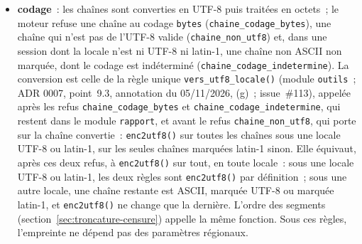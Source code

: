 \documentclass[a4paper,11pt]{article}
\newcommand{\code}[1]{\texttt{\small #1}}
\begin{document}
\begin{itemize}[leftmargin=*, itemsep=2pt]
    l'année toujours sur quatre chiffres
    (\code{sprintf("\%04d-\%02d-\%02d", ...)} sur les composantes de la
    date, \code{composantes\_date()}~; \code{format.Date} écrivait
    \code{999-01-01} sans zéro initial), et une date manquante par un jeton
    lu sur la valeur reçue, \code{NA} ou \code{NaN}, sans les confondre,
    comme pour un double (ADR 0011, point~4, et seconde annotation du
    19/10/2026, point~(d)~; issue~\#19)~; l'écrivain refuse, en garde-fou des
    contrôles de l'étape \code{donnees}, une date hors du domaine
    (\code{date\_hors\_domaine}, ici pour la seule colonne écrite, son
    rôle et ses lignes dans \code{details}) et une date non entière
    (\code{date\_non\_entiere}~: 100 et 100,5 jours s'écriraient de même)~;
    chaînes et facteurs (convertis en chaînes, les niveaux n'entrent pas)~:
    octets UTF-8 entre guillemets droits, avec cinq échappements
    (\verb|\\|, \verb|\n|, \verb|\r|, \verb|\t|, \verb|\"|), \code{NA} sans
    guillemets pour une valeur manquante~;
  \item \textbf{codage}~: les chaînes sont converties en UTF-8 puis traitées en
    octets~; le moteur refuse une chaîne au codage \code{bytes}
    (\code{chaine\_codage\_bytes}), une chaîne qui n'est pas de l'UTF-8 valide
    (\code{chaine\_non\_utf8}) et, dans une session dont la locale n'est ni
    UTF-8 ni latin-1, une chaîne non ASCII non marquée, dont le codage est
    indéterminé (\code{chaine\_codage\_indetermine}). La conversion est
    celle de la règle unique \code{vers\_utf8\_locale()} (module
    \code{outils}~; ADR 0007, point~9.3, annotation du 05/11/2026, (g)~;
    issue~\#113), appelée après les refus \code{chaine\_codage\_bytes}
    et \code{chaine\_codage\_indetermine}, qui restent dans le module
    \code{rapport}, et avant le refus \code{chaine\_non\_utf8}, qui porte
    sur la chaîne convertie~: \code{enc2utf8()} sur toutes les chaînes sous
    une locale UTF-8 ou latin-1, sur les seules chaînes marquées latin-1
    sinon. Elle équivaut, après ces deux refus, à \code{enc2utf8()} sur
    tout, en toute locale~: sous une locale UTF-8 ou latin-1, les deux
    règles sont \code{enc2utf8()} par définition~; sous une autre locale,
    une chaîne restante est ASCII, marquée UTF-8 ou marquée latin-1, et
    \code{enc2utf8()} ne change que la dernière. L'ordre des segments (section~\ref{sec:troncature-censure})
    appelle la même fonction. Sous ces règles,
    l'empreinte ne dépend pas des paramètres régionaux.
\end{itemize}
\end{document}
